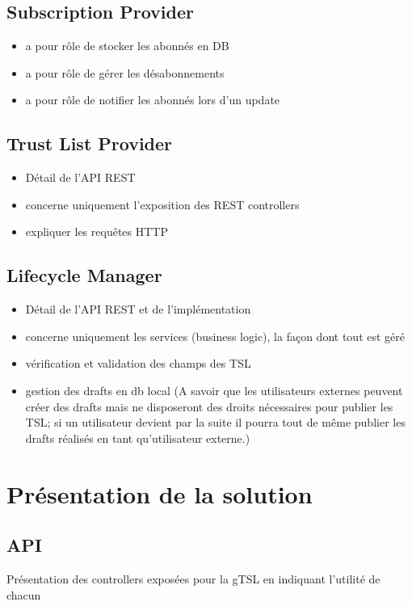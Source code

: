 \documentclass{tnreport}
\begin{document}
\subsection{Subscription Provider}

\begin{itemize}
	\item a pour rôle de stocker les abonnés en DB
	\item a pour rôle de gérer les désabonnements
	\item a pour rôle de notifier les abonnés lors d'un update
\end{itemize}

\subsection{Trust List Provider}

\begin{itemize}
	\item Détail de l'API REST
	\item concerne uniquement l'exposition des REST controllers
	\item expliquer les requêtes HTTP
\end{itemize}

\subsection{Lifecycle Manager}

\begin{itemize}
	\item Détail de l'API REST et de l'implémentation
	\item concerne uniquement les services (business logic), la façon dont tout est géré
	\item vérification et validation des champs des TSL
	\item gestion des drafts en db local (A savoir que les utilisateurs externes peuvent créer des drafts mais ne disposeront des droits nécessaires pour publier les TSL; si un utilisateur devient par la suite il pourra tout de même publier les drafts réalisés en tant qu'utilisateur externe.)
\end{itemize}

\section{Présentation de la solution}

\subsection{API}
Présentation des controllers exposées pour la gTSL en indiquant l'utilité de chacun
\end{document}
